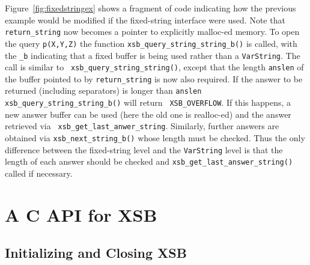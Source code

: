 Figure~\ref{fig:fixedstringex} shows a fragment of code indicating how
the previous example would be modified if the fixed-string interface
were used.  Note that {\tt return\_string} now becomes a pointer to
explicitly malloc-ed memory.  To open the query {\tt p(X,Y,Z)} the
function {\tt xsb\_query\_string\_string\_b()} is called, with the
{\tt \_b} indicating that a fixed buffer is being used rather than a
{\tt VarString}.  The call is similar to {\tt
  xsb\_query\_string\_string()}, except that the length {\tt anslen}
of the buffer pointed to by {\tt return\_string} is now also required.
If the answer to be returned (including separators) is longer than
{\tt anslen} {\tt xsb\_query\_string\_string\_b()} will return {\tt
  XSB\_OVERFLOW}.  If this happens, a new answer buffer can be used
(here the old one is realloc-ed) and the answer retrieved via {\tt
  xsb\_get\_last\_anwer\_string}.  Similarly, further answers are
obtained via {\tt xsb\_next\_string\_b()} whose length must be
checked.  Thus the only difference between the fixed-string level and
the {\tt VarString} level is that the length of each answer should be
checked and {\tt xsb\_get\_last\_answer\_string()} called if
necessary.

\section{A C API for XSB} \label{sec:CAPI}
%
\subsection{Initializing and Closing XSB}

